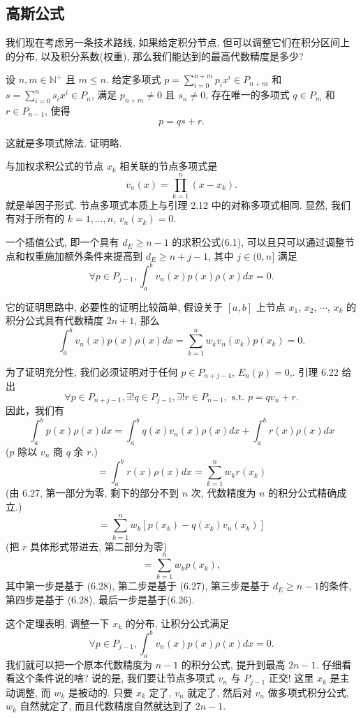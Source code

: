 \documentclass[a4paper]{ctexart}
\newcommand{\hl}[1]
{\noindent {\bf {#1}}}
\begin{document}
\subsection{高斯公式}

我们现在考虑另一条技术路线, 如果给定积分节点, 但可以调整它们在积分区间上的分布,
以及积分系数(权重), 那么我们能达到的最高代数精度是多少?

\hl{引理6.22} 设 $n, m \in \mathbb{N}^+$ 且 $m \leq n$. 
给定多项式 $p = \sum_{i=0}^{n+m} p_i x^i \in P_{n + m}$ 和 
$s = \sum_{i=0}^{n} s_i x^i \in P_{n}$, 满足 $p_{n + m} \neq 0$
且 $s_n \neq 0$, 存在唯一的多项式 $q \in P_{m}$ 和 $r \in P_{n - 1}$, 
使得
$$ 
p = qs + r. 
$$

这就是多项式除法. 证明略. 

\hl{定义 6.23} 与加权求积公式的节点 $x_k$ 相关联的节点多项式是
$$ 
v_n(x) = \prod_{k=1}^{n} (x - x_k). 
$$
就是单因子形式. 节点多项式本质上与引理 2.12 中的对称多项式相同. 
显然, 我们有对于所有的 $k = 1, \ldots, n$, $v_n(x_k) = 0$.

\hl{定理6.24} 一个插值公式, 即一个具有 $d_E \geq n - 1$ 的求积公式(6.1), 
可以且只可以通过调整节点和权重施加额外条件来提高到 
$d_E \geq n + j - 1$, 其中 $j \in (0, n]$ 满足
$$ 
\forall p \in P_{j-1}, \int_{a}^{b} v_n(x)p(x)\rho(x)dx = 0. 
$$ 

它的证明思路中, 必要性的证明比较简单, 
假设关于 $[a, b]$ 上节点 $x_1$, $x_2$, $\cdots$, $x_k$ 
的积分公式具有代数精度 $2n + 1$, 那么
$$ 
\int_{a}^{b} v_n(x)p(x)\rho(x)dx = \sum_{k=1}^{n} w_k v_n(x_k) p(x_k) = 0. 
$$

为了证明充分性, 我们必须证明对于任何 $p \in P_{n + j - 1}$, $E_n(p) = 0$,.
引理 6.22 给出
$$ 
\forall p \in P_{n + j - 1}, \exists! q \in P_{j - 1}, \exists! 
r \in P_{n-1}, \text{ s.t. } p = qv_n + r. 
$$
因此，我们有
$$ 
\int_{a}^{b} p(x) \rho(x)dx 
= \int_{a}^{b} q(x) v_n(x) \rho(x)dx + \int_{a}^{b} r(x) \rho(x)dx 
$$
($p$ 除以 $v_n$ 商 $q$ 余 $r$.)
$$ 
= \int_{a}^{b} r(x) \rho(x)dx = \sum_{k=1}^{n} w_k r(x_k) 
$$
(由 6.27, 第一部分为零, 剩下的部分不到 $n$ 次, 代数精度为 $n$ 的积分公式精确成立.)
$$ 
= \sum_{k=1}^{n} w_k [p(x_k) - q(x_k)v_n(x_k)] 
$$
(把 $r$ 具体形式带进去, 第二部分为零)
$$
= \sum_{k=1}^{n} w_k p(x_k),
$$
其中第一步是基于 (6.28), 第二步是基于 (6.27), 第三步是基于 $d_E \geq n - 1$的条件, 
第四步是基于 (6.28), 最后一步是基于(6.26). 

这个定理表明, 调整一下 $x_k$ 的分布, 让积分公式满足
$$ 
\forall p \in P_{j - 1}, \int_{a}^{b} v_n(x)p(x)\rho(x)dx = 0. 
$$
我们就可以把一个原本代数精度为 $n - 1$ 的积分公式, 提升到最高 $2n - 1$. 
仔细看看这个条件说的啥? 说的是, 我们要让节点多项式 $v_n$ 与 $P_{j - 1}$ 正交!
这里 $x_k$ 是主动调整, 而 $w_k$ 是被动的. 只要 $x_k$ 定了, $v_n$ 就定了, 
然后对 $v_n$ 做多项式积分公式, $w_k$ 自然就定了, 而且代数精度自然就达到了 $2n - 1$.
\end{document}
